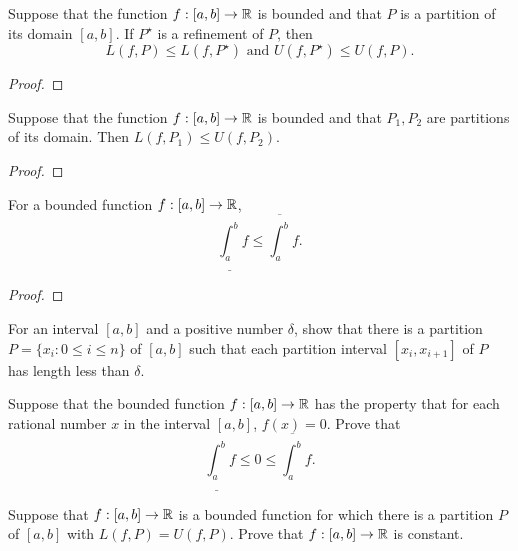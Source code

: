 \documentclass[letterpaper, twoside, 12pt]{book}
\begin{document}
\begin{lemma}
  Suppose that the function \(f:[a,b]\to\mathbb R\) is bounded and that \(P\)
  is a partition of its domain \([a,b]\). If \(P^\star\) is a refinement
  of \(P\), then
  \[
    L(f,P)\leq L(f,P^\star)
      \text{ and }
    U(f,P^\star)\leq U(f,P)
  .\]
\end{lemma}
\begin{proof}

\end{proof}


\begin{lemma}[6.3]
  Suppose that the function \(f:[a,b]\to\mathbb R\) is bounded and that
  \(P_1,P_2\) are partitions of its domain. Then \(L(f,P_1)\leq U(f,P_2)\).
\end{lemma}
\begin{proof}

\end{proof}


\begin{lemma}[6.4]
  For a bounded function \(f:[a,b]\to\mathbb R\),
  \[
    \underline{\int_a^b} f
      \leq
    \overline{\int_a^b} f
  .\]
\end{lemma}
\begin{proof}

\end{proof}

\begin{exercise}[2]
  For an interval \([a,b]\) and a positive number \(\delta\),
  show that there is a partition \(P=\{x_i:0\leq i\leq n\}\) of
  \([a,b]\) such that each partition interval \([x_i,x_{i+1}]\)
  of \(P\) has length less than \(\delta\).
\end{exercise}
\begin{solution}

\end{solution}


\begin{exercise}[3]
  Suppose that the bounded function \(f:[a,b]\to\mathbb R\) has the property
  that for each rational number \(x\) in the interval \([a,b]\),
  \(f(x)=0\). Prove that
  \[
    \underline{\int_a^b}f
      \leq
    0
      \leq
    \overline{\int_a^b}f
  .\]
\end{exercise}
\begin{solution}

\end{solution}


\begin{exercise}[6]
  Suppose that \(f:[a,b]\to\mathbb R\) is a bounded function for which there is
  a partition \(P\) of \([a,b]\) with \(L(f,P)=U(f,P)\). Prove that
  \(f:[a,b]\to\mathbb R\) is constant.
\end{exercise}
\begin{solution}

\end{solution}
\end{document}
